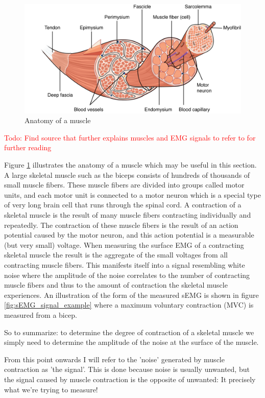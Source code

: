\begin{figure}[h!t]
	\begin{center}
		\includegraphics[width=0.7\columnwidth]{images/muscle_anatomy.png}
	\end{center}
	\caption{Anatomy of a muscle \cite{muscle_anatomy}}
	\label{fig:muscle_anatomy}
\end{figure}

\textcolor{red}{Todo: Find source that further explains muscles and EMG signals to refer to for further reading}

Figure \ref{fig:muscle_anatomy} illustrates the anatomy of a muscle which may be useful in this section. 
A large skeletal muscle such as the biceps consists of hundreds of thousands of small muscle fibers. These muscle fibers are divided into groups called motor units, and each motor unit is connected to a motor neuron which is a special type of very long brain cell that runs through the spinal cord. A contraction of a skeletal muscle is the result of many muscle fibers contracting individually and repeatedly. The contraction of these muscle fibers is the result of an action potential caused by the motor neuron, and this action potential is a measurable (but very small) voltage. When measuring the surface EMG of a contracting skeletal muscle the result is the aggregate of the small voltages from all contracting muscle fibers. This manifests itself into a signal resembling white noise where the amplitude of the noise correlates to the number of contracting muscle fibers and thus to the amount of contraction the skeletal muscle experiences. An illustration of the form of the measured sEMG is shown in figure \ref{fig:sEMG_signal_example} where a maximum voluntary contraction (MVC) is measured from a bicep.
 
So to summarize: to determine the degree of contraction of a skeletal muscle we simply need to determine the amplitude of the noise at the surface of the muscle.

From this point onwards I will refer to the 'noise' generated by muscle contraction as 'the signal'. This is done because noise is usually unwanted, but the signal caused by muscle contraction is the opposite of unwanted: It precisely what we're trying to measure! 

